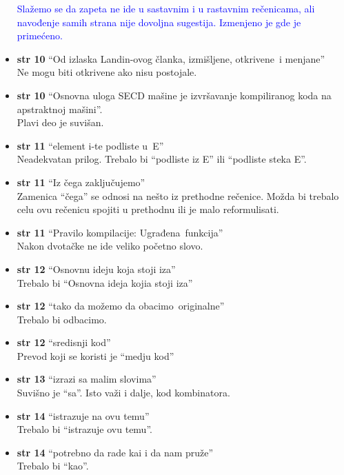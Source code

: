 \documentclass[a4paper]{report}
\newcommand{\odgovor}[1]{\textcolor{blue}{#1}}
\begin{document}
\begin{itemize}
\odgovor{Slažemo se da zapeta ne ide u sastavnim i u rastavnim rečenicama, ali navođenje samih strana nije dovoljna sugestija. Izmenjeno je gde je primećeno.}
\item \textbf{str 10} ``Od izlaska Landin-ovog članka, izmišljene, \color{blue}otkrivene\color{black}~i menjane'' \\ Ne mogu biti otkrivene ako nisu postojale.
\item \textbf{str 10} ``Osnovna uloga SECD mašine je izvršavanje kompiliranog koda \color{blue}na apstraktnoj mašini\color{black}''. \\ Plavi deo je suvišan.
\item \textbf{str 11} ``element i-te podliste \color{blue}u\color{black}~E'' \\ Neadekvatan prilog. Trebalo bi ``podliste iz E'' ili ``podliste steka E''.
\item \textbf{str 11} ``Iz čega zaključujemo'' \\ Zamenica ``čega'' se odnosi na nešto iz prethodne rečenice. Možda bi trebalo celu ovu rečenicu spojiti u prethodnu ili je malo reformulisati.
\item \textbf{str 11} ``Pravilo kompilacije: \color{blue}Ugrađena\color{black}~funkcija'' \\ Nakon dvotačke ne ide veliko početno slovo.
\item \textbf{str 12} ``Osnovnu ideju koja stoji iza'' \\ Trebalo bi ``Osnovna ideja kojia stoji iza''
\item \textbf{str 12} ``tako da možemo da \color{blue}obacimo\color{black}~originalne'' \\ Trebalo bi \color{blue}odbacimo\color{black}.
\item \textbf{str 12} ``sredisnji kod'' \\ Prevod koji se koristi je ``medju kod''
\item \textbf{str 13} ``izrazi \color{blue}sa\color{black} malim slovima'' \\ Suvišno je ``sa''. Isto važi i dalje, kod kombinatora.
\item \textbf{str 14} ``istrazuje na ovu temu'' \\ Trebalo bi ``istrazuje ovu temu''.
\item \textbf{str 14} ``potrebno da rade \color{blue}kai\color{black} i da nam pruže'' \\ Trebalo bi ``kao''.

\end{itemize}
\end{document}
